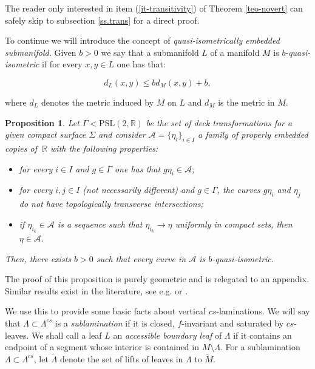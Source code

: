 \documentclass[11pt]{amsart} %
\newcommand{\Lam}{\Lambda}
\numberwithin{equation}{section}
\newtheorem{prop}[equation]{Proposition}
\theoremstyle{remark}
\begin{document}
The reader only interested in item (\ref{it-transitivity}) of Theorem \ref{teo-novert} can safely skip to subsection \ref{ss.trans} for a direct proof. 

To continue we will introduce the concept of \emph{quasi-isometrically embedded submanifold.} Given $b>0$ we say that a submanifold $L$ of a manifold $M$ is $b$-\emph{quasi-isometric} if for every $x,y \in L$ one has that:

$$ d_L (x,y) \leq b d_M (x,y) + b,  $$

\noindent where $d_L$ denotes the metric induced by $M$ on $L$ and $d_M$ is the metric in $M$. 

\begin{prop}\label{prop-quasigeodesic}
   Let $\Gamma < \mathrm{PSL}(2,\mathbb{R})$ be the set of deck transformations for a given compact surface $\Sigma$ and consider $\mathcal{A}=\{\eta_i\}_{i \in I}$ a family of properly embedded copies of  $\ \mathbb{R}$ with the following properties: 
   \begin{itemize}
   \item for every $i \in I$ and $g \in \Gamma$ one has that $g \eta_i \in \mathcal{A}$;
   \item for every $i,j \in I$ (not necessarily different) and $g \in \Gamma$, the curves $g \eta_i$ and $\eta_j$ do not have topologically transverse intersections; 
   \item if $\eta_{i_k} \in \mathcal{A}$ is a sequence such that $\eta_{i_k} \to \eta$ uniformly in compact sets, then $\eta \in \mathcal{A}$. 
   \end{itemize}
   Then, there exists $b>0$ such that every curve in $\mathcal{A}$ is $b$-quasi-isometric. 
 \end{prop}

The proof of this proposition is purely geometric and is relegated to an appendix. Similar results exist in the literature, see e.g. \cite{Levitt} or \cite{Calegari}. 


We use this to provide some basic facts about vertical $cs$-laminations. We will say that $\Lambda \subset \Lambda^{cs}$ is a \emph{sublamination} if it is closed, $f$-invariant and saturated by $cs$-leaves. We shall call a leaf $L$ an \emph{accessible boundary leaf} of $\Lam$  if it contains an endpoint of a segment whose interior is contained in $M\setminus \Lambda$. For a sublamination $\Lambda \subset \Lambda^{cs}$, let $\tilde \Lambda$ denote the set of lifts of leaves in $\Lambda$ to $\tilde M$. 
\end{document}
